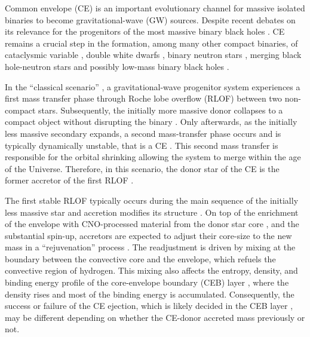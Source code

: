 \documentclass[twocolumn,twocolappendix,trackchanges]{aastex63}
\begin{document}
Common envelope (CE) is an important evolutionary channel for
massive isolated binaries to become gravitational-wave (GW) sources. Despite
recent debates on its relevance for the progenitors of the most
massive binary black holes \citep[e.g.,][]{pavlovskii:2017,
  klencki:2020, klencki:2021, vanson:2021, marchant:2021}.
CE remains a crucial step in the
formation, among many other compact binaries, of cataclysmic variable
\citep{paczynski:1976}, double white dwarfs
\citep[e.g.,][]{korol:2017, renzo:21gwce, thiele:21}, binary neutron stars
\citep[NS, e.g.,][]{vigna-gomez:2018}, merging black hole-neutron stars
\citep[e.g.,][]{kruckow:18, broekgaarden:21} and possibly low-mass binary black
holes \citep[BH, e.g.,][]{dominik:2012, vanson:2021}.

In the ``classical scenario'' \citep[e.g.,][]{tutukov:93,belczynski:2016}, a
gravitational-wave progenitor system experiences a first mass transfer
phase through Roche lobe overflow (RLOF) between two non-compact
stars. Subsequently, the initially more massive donor collapses to a
compact object without disrupting the binary
\citep[e.g.,][]{blaauw:1961,renzo:2019walk}. Only afterwards, as the
initially less massive secondary expands, a second mass-transfer phase
occurs and is typically dynamically unstable, that is a CE
\citep[e.g.,][]{dominik:2012, belczynski:2016, kruckow:18}. This
second mass transfer is responsible for the orbital shrinking
\citep{paczynski:1976} allowing the system to merge within the age of
the Universe. Therefore, in this scenario, the donor star of the CE is
the former accretor of the first RLOF \citep[e.g.,][]{klencki:2020,
  law-smith:2020, renzo:2021zoph}.

The first stable RLOF typically occurs during the main sequence of the
initially less massive star and accretion modifies its structure
\citep[e.g.,][]{neo:1977, packet:1981, blaauw:1993, cantiello:2007,
  renzo:2021zoph}. On top of the enrichment of the envelope with
CNO-processed material from the donor star core \citep{blaauw:1993,
  renzo:2021zoph, el-badry:2022a}, and the substantial spin-up, accretors are expected
to adjust their core-size to the new mass in a ``rejuvenation''
process \citep[e.g.,][]{neo:1977, hellings:1983, hellings:1984}. The
readjustment is driven by  mixing at the boundary between the
convective core and the envelope, which refuels the convective region
of hydrogen. This mixing also affects the entropy, density, and
binding energy profile of the core-envelope boundary (CEB) layer
\citep[][]{renzo:2021zoph}, where the density rises and most of the
binding energy is accumulated. Consequently, the success or failure
of the CE ejection, which is likely decided in the CEB layer
\citep[e.g.,][]{ivanova:2013}, may be different depending on whether the CE-donor
accreted mass previously or not.
\end{document}
